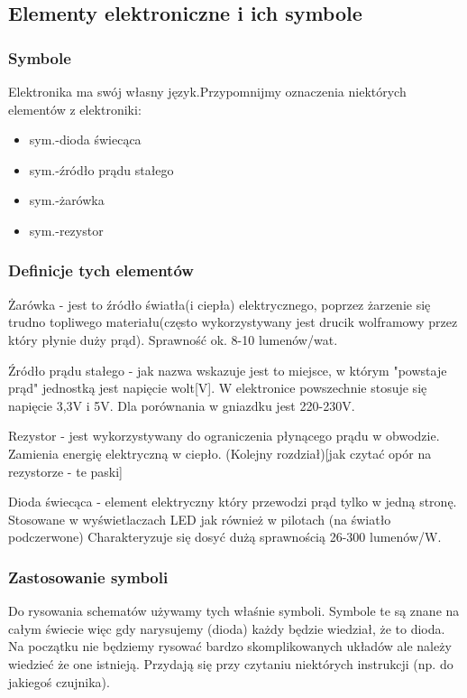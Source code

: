 \documentclass[a4paper,12pt, twoside]{article}
\begin{document}
	\subsection{Elementy elektroniczne i ich symbole}
	\subsubsection {Symbole}
	Elektronika ma swój własny język.Przypomnijmy oznaczenia niektórych elementów z elektroniki:
\begin{itemize}
	\item sym.-dioda świecąca
	\item sym.-źródło prądu stałego
	\item sym.-żarówka
	\item sym.-rezystor
\end{itemize}
   \subsubsection{Definicje tych elementów}
	
Żarówka - jest to źródło światła(i ciepła) elektrycznego, poprzez żarzenie się trudno topliwego materiału(często wykorzystywany jest drucik wolframowy przez który płynie duży prąd). Sprawność ok.
8-10 lumenów/wat. 

Źródło prądu stałego - jak nazwa wskazuje jest to miejsce, w którym "powstaje prąd" jednostką jest napięcie wolt[V]. W elektronice powszechnie stosuje się napięcie 3,3V i 5V. Dla porównania w gniazdku jest 220-230V.

Rezystor - jest wykorzystywany do ograniczenia płynącego prądu w obwodzie. Zamienia energię elektryczną w ciepło. (Kolejny rozdział)[jak czytać opór na rezystorze - te paski]

Dioda świecąca - element elektryczny który przewodzi prąd tylko w jedną stronę. Stosowane w wyświetlaczach LED jak również w pilotach (na światło podczerwone) Charakteryzuje się dosyć dużą sprawnością 26-300 lumenów/W. 

\subsubsection{Zastosowanie symboli}
    
Do rysowania schematów używamy tych właśnie symboli. Symbole te są znane na całym świecie więc gdy narysujemy (dioda) każdy będzie wiedział, że to dioda. Na początku nie będziemy rysować bardzo skomplikowanych układów ale należy wiedzieć że one istnieją. Przydają się przy czytaniu niektórych instrukcji (np. do jakiegoś czujnika).
\end{document}
